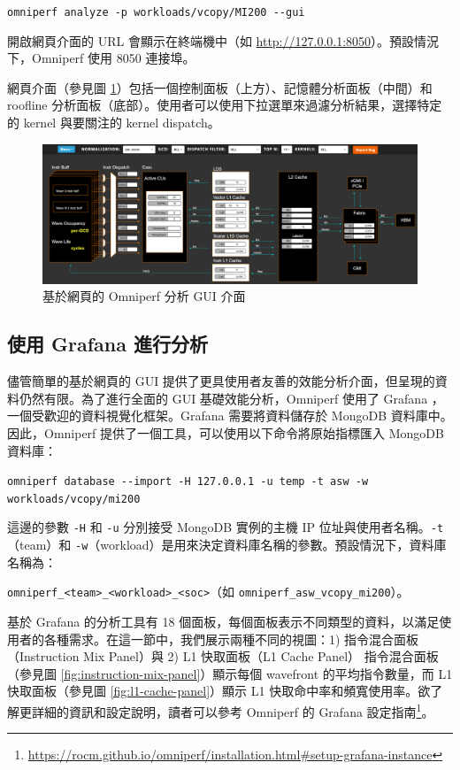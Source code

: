 \lstinline|omniperf analyze -p workloads/vcopy/MI200 --gui|

開啟網頁介面的 URL 會顯示在終端機中（如 \url{http://127.0.0.1:8050}）。預設情況下，Omniperf 使用 8050 連接埠。

網頁介面（參見圖 \ref{fig:omniperf-web-interface}）包括一個控制面板（上方）、記憶體分析面板（中間）和 roofline 分析面板（底部）。使用者可以使用下拉選單來過濾分析結果，選擇特定的 kernel 與要關注的 kernel dispatch。

\begin{figure}
    \centering
    \includegraphics[width=1\linewidth]{Appendici/OmniperfWebInterface}
    \caption{基於網頁的 Omniperf 分析 GUI 介面}
    \label{fig:omniperf-web-interface}
\end{figure}


\subsection{使用 Grafana 進行分析}
儘管簡單的基於網頁的 GUI 提供了更具使用者友善的效能分析介面，但呈現的資料仍然有限。為了進行全面的 GUI 基礎效能分析，Omniperf 使用了 Grafana \cite{chakraborty2021grafana}，一個受歡迎的資料視覺化框架。Grafana 需要將資料儲存於 MongoDB 資料庫中。因此，Omniperf 提供了一個工具，可以使用以下命令將原始指標匯入 MongoDB 資料庫：

\lstinline|omniperf database --import -H 127.0.0.1 -u temp -t asw -w workloads/vcopy/mi200|

這邊的參數 \lstinline|-H| 和 \lstinline|-u| 分別接受 MongoDB 實例的主機 IP 位址與使用者名稱。\lstinline|-t|（team）和 \lstinline|-w|（workload）是用來決定資料庫名稱的參數。預設情況下，資料庫名稱為：

\lstinline|omniperf_<team>_<workload>_<soc>|（如 \lstinline|omniperf_asw_vcopy_mi200|）。

基於 Grafana 的分析工具有 18 個面板，每個面板表示不同類型的資料，以滿足使用者的各種需求。在這一節中，我們展示兩種不同的視圖：1) 指令混合面板（Instruction Mix Panel）與 2) L1 快取面板（L1 Cache Panel）
指令混合面板（參見圖 \ref{fig:instruction-mix-panel}）顯示每個 wavefront 的平均指令數量，而 L1 快取面板（參見圖 \ref{fig:l1-cache-panel}）顯示 L1 快取命中率和頻寬使用率。欲了解更詳細的資訊和設定說明，讀者可以參考 Omniperf 的 Grafana 設定指南\footnote{\url{https://rocm.github.io/omniperf/installation.html#setup-grafana-instance}}。

